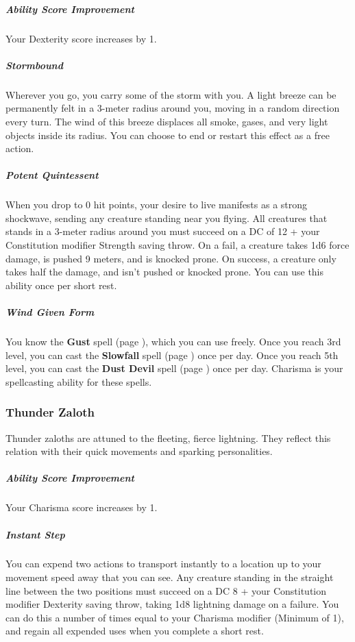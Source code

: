     \subparagraph{Ability Score Improvement}
        Your Dexterity score increases by 1.

    \subparagraph{Stormbound}
        Wherever you go, you carry some of the storm with you.
        A light breeze can be permanently felt in a 3-meter radius around you, moving in a random direction every turn.
        The wind of this breeze displaces all smoke, gases, and very light objects inside its radius.
        You can choose to end or restart this effect as a free action.

    \subparagraph{Potent Quintessent}
        When you drop to 0 hit points, your desire to live manifests as a strong shockwave, sending any creature standing near you flying.
        All creatures that stands in a 3-meter radius around you must succeed on a DC of 12 + your Constitution modifier Strength saving throw.
        On a fail, a creature takes 1d6 force damage, is pushed 9 meters, and is knocked prone.
        On success, a creature only takes half the damage, and isn't pushed or knocked prone.
        You can use this ability once per short rest.

    \subparagraph{Wind Given Form}
        You know the \textbf{Gust} spell (page \pageref{spell::gust}), which you can use freely.
        Once you reach 3rd level, you can cast the \textbf{Slowfall} spell (page \pageref{spell::slowfall}) once per day.
        Once you reach 5th level, you can cast the \textbf{Dust Devil} spell (page \pageref{spell::dustdevil}) once per day.
        Charisma is your spellcasting ability for these spells.

\subsubsection{Thunder Zaloth}
    Thunder zaloths are attuned to the fleeting, fierce lightning.
    They reflect this relation with their quick movements and sparking personalities.

    \subparagraph{Ability Score Improvement}
        Your Charisma score increases by 1.

    \subparagraph{Instant Step}
        You can expend two actions to transport instantly to a location up to your movement speed away that you can see.
        Any creature standing in the straight line between the two positions must succeed on a DC 8 + your Constitution modifier Dexterity saving throw, taking 1d8 lightning damage on a failure.
        You can do this a number of times equal to your Charisma modifier (Minimum of 1), and regain all expended uses when you complete a short rest.

